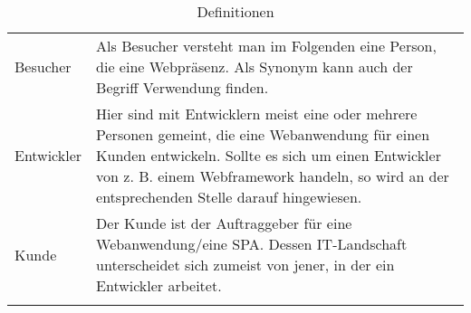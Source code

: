 \begin{longtable}{| p{} | p{} |} 
	\hline 
	\thead{Begriff} & \thead{Definition} \\ 	
	\hline
	Besucher & Als Besucher versteht man im Folgenden eine Person, die eine Webpräsenz. Als Synonym kann auch der Begriff \quotes{Anwender} Verwendung finden.
	\\
	\hline 
	Entwickler & %
	Hier sind mit Entwicklern meist eine oder mehrere Personen gemeint, die eine Webanwendung für einen Kunden entwickeln. Sollte es sich um einen Entwickler von z. B. einem Webframework handeln, so wird an der entsprechenden Stelle darauf hingewiesen.
	\\
	\hline 
	Kunde & Der Kunde ist der Auftraggeber für eine Webanwendung/eine SPA. Dessen IT-Landschaft unterscheidet sich zumeist von jener, in der ein Entwickler arbeitet. 
	\\
	\hline 
	
	\caption{Definitionen}\label{tab:definitionen}
\end{longtable}